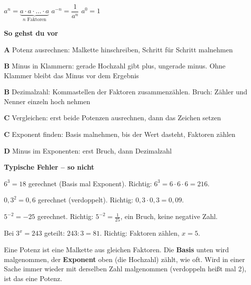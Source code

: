 \documentclass[11pt]{article}
\newcommand{\nr}[1]{\makebox[7mm][l]{\textbf{#1}}}
\begin{document}
\begin{tcolorbox}[colback=mbkasten,colframe=mbgrau,boxrule=0.5pt,arc=1mm,left=3mm,right=3mm,top=2mm,bottom=2mm,title={\bfseries Formel auf einen Blick},coltitle=black,colbacktitle=black!10]
{\Large $a^n = \underbrace{a \cdot a \cdot \ldots \cdot a}_{n \text{ Faktoren}}$ \qquad $a^{-n} = \dfrac{1}{a^n}$ \qquad $a^0 = 1$}\par\medskip
\textbf{So gehst du vor}\par
\nr{1}\textbf{A} Potenz ausrechnen: Malkette hinschreiben, Schritt für Schritt malnehmen\par
\nr{2}\textbf{B} Minus in Klammern: gerade Hochzahl gibt plus, ungerade minus. Ohne Klammer bleibt das Minus vor dem Ergebnis\par
\nr{3}\textbf{B} Dezimalzahl: Kommastellen der Faktoren zusammenzählen. Bruch: Zähler und Nenner einzeln hoch nehmen\par
\nr{4}\textbf{C} Vergleichen: erst beide Potenzen ausrechnen, dann das Zeichen setzen\par
\nr{5}\textbf{C} Exponent finden: Basis malnehmen, bis der Wert dasteht, Faktoren zählen\par
\nr{6}\textbf{D} Minus im Exponenten: erst Bruch, dann Dezimalzahl\par
\medskip
\end{tcolorbox}
\medskip\noindent\textbf{Typische Fehler – so nicht}\par\smallskip
\noindent\nr{$\times$}$6^3 = 18$ gerechnet (Basis mal Exponent). Richtig: $6^3 = 6 \cdot 6 \cdot 6 = 216$.\par
\noindent\nr{$\times$}$0{,}3^2 = 0{,}6$ gerechnet (verdoppelt). Richtig: $0{,}3 \cdot 0{,}3 = 0{,}09$.\par
\noindent\nr{$\times$}$5^{-2} = -25$ gerechnet. Richtig: $5^{-2} = \frac{1}{25}$, ein Bruch, keine negative Zahl.\par
\noindent\nr{$\times$}Bei $3^x = 243$ geteilt: $243 : 3 = 81$. Richtig: Faktoren zählen, $x = 5$.\par
\clearpage\label{s:A}\noindent\colorbox{black!12}{}\hspace{3mm}{\Large\bfseries Potenz als Malkette}\par\smallskip
\noindent Eine Potenz ist eine Malkette aus gleichen Faktoren. Die \textbf{Basis} unten wird malgenommen, der \textbf{Exponent} oben (die Hochzahl) zählt, wie oft. Wird in einer Sache immer wieder mit derselben Zahl malgenommen (verdoppeln heißt mal 2), ist das eine Potenz.\par\medskip
\end{document}
